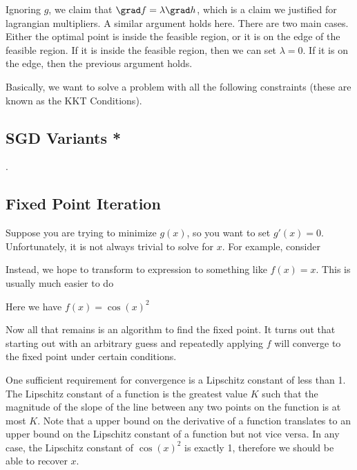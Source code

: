 \documentclass[12pt]{article}
\begin{document}

Ignoring $g$, we claim that $\grad f = \lambda \grad h$, which is a claim we justified for lagrangian multipliers. A similar argument holds here. There are two main cases. Either the optimal point is inside the feasible region, or it is on the edge of the feasible region. If it is inside the feasible region, then we can set $\lambda = 0$. If it is on the edge, then the previous argument holds.

Basically, we want to solve a problem with all the following constraints (these are known as the KKT Conditions). 


\subsection{SGD Variants *}
.
\subsection{Fixed Point Iteration}

Suppose you are trying to minimize $g(x)$, so you want to set $g'(x) = 0$. Unfortunately, it is not always trivial to solve for $x$. For example, consider


Instead, we hope to transform to expression to something like $f(x) = x$. This is usually much easier to do


Here we have $f(x) = \cos(x)^2$

Now all that remains is an algorithm to find the fixed point. It turns out that starting out with an arbitrary guess and repeatedly applying $f$ will converge to the fixed point under certain conditions.

One sufficient requirement for convergence is a Lipschitz constant of less than 1. The Lipschitz constant of a function is the greatest value $K$ such that the magnitude of the slope of the line between any two points on the function is at most $K$. Note that a upper bound on the derivative of a function translates to an upper bound on the Lipschitz constant of a function but not vice versa. In any case, the Lipschitz constant of $\cos(x)^2$ is exactly 1, therefore we should be able to recover $x$.
\end{document}
